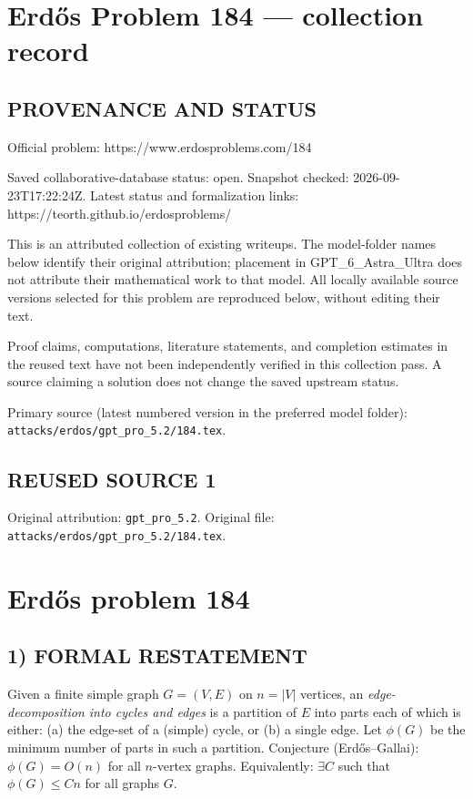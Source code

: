 \section*{Erd\H{o}s Problem 184 --- collection record}

\subsection*{PROVENANCE AND STATUS}
Official problem: https://www.erdosproblems.com/184

Saved collaborative-database status: open.
Snapshot checked: 2026-09-23T17:22:24Z.
Latest status and formalization links: https://teorth.github.io/erdosproblems/

This is an attributed collection of existing writeups. The model-folder names below identify their original attribution; placement in GPT\_6\_Astra\_Ultra does not attribute their mathematical work to that model. All locally available source versions selected for this problem are reproduced below, without editing their text.

Proof claims, computations, literature statements, and completion estimates in the reused text have not been independently verified in this collection pass. A source claiming a solution does not change the saved upstream status.

Primary source (latest numbered version in the preferred model folder): \texttt{attacks/erdos/gpt\_pro\_5.2/184.tex}.

\subsection*{REUSED SOURCE 1}
Original attribution: \texttt{gpt\_pro\_5.2}.
Original file: \texttt{attacks/erdos/gpt\_pro\_5.2/184.tex}.

\section*{Erd\H{o}s problem 184}

\subsection*{1) FORMAL RESTATEMENT}
Given a finite simple graph $G=(V,E)$ on $n=|V|$ vertices, an \emph{edge-decomposition into cycles and edges} is a partition of $E$
into parts each of which is either:
(a) the edge-set of a (simple) cycle, or (b) a single edge.
Let $\phi(G)$ be the minimum number of parts in such a partition.
Conjecture (Erd\H{o}s--Gallai): $\phi(G)=O(n)$ for all $n$-vertex graphs.
Equivalently: $\exists C$ such that $\phi(G)\le Cn$ for all graphs $G$.

